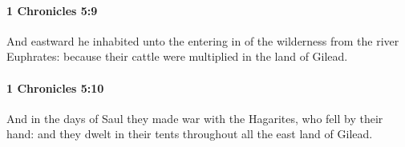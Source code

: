 		\paragraph{1 Chronicles 5:9} %
			\label{1CHRONICLES-5-9}

			And eastward he inhabited unto the entering in of the wilderness from the river Euphrates: because their cattle were multiplied in the land of Gilead.


		\paragraph{1 Chronicles 5:10} %
			\label{1CHRONICLES-5-10}

			And in the days of Saul they made war with the Hagarites, who fell by their hand: and they dwelt in their tents throughout all the east land of Gilead.


